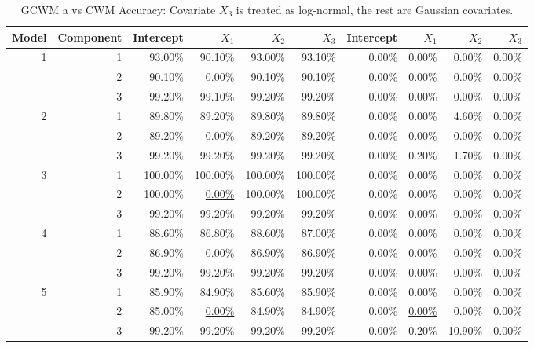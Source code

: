 \documentclass[11pt,letterpaper]{article}
\numberwithin{equation}{section}
\numberwithin{equation}{section}
\numberwithin{equation}{section}
\begin{document}
\begin{center}
\begin{table}[!htb]
\label{my-label}
\caption{GCWM a vs CWM Accuracy: Covariate $X_3$ is treated as log-normal, the rest are Gaussian covariates.}
\begin{adjustwidth}{-1cm}{}
\begin{tabular}{|rrrrrr|rrrr|}
\hline\hline
Model & Component & Intercept & $X_1$ &$X_2$ & $X_3$& Intercept & $X_1$ &$X_2$ & $X_3$  \\
\hline
1     & 1         & 93.00\%   & 90.10\%  & 93.00\%  & 93.10\% & 0.00\% & 0.00\% & 0.00\% & 0.00\%   \\
      & 2         & 90.10\%   & \underline{0.00\%}   & 90.10\%  & 90.10\% & 0.00\% & 0.00\% & 0.00\% & 0.00\%  \\
      & 3         & 99.20\%   & 99.10\%  & 99.20\%  & 99.20\% & 0.00\% & 0.00\% & 0.00\% & 0.00\%  \\
2     & 1         & 89.80\%   & 89.20\%  & 89.80\%  & 89.80\% & 0.00\% & 0.00\% & 4.60\% & 0.00\%  \\
      & 2         & 89.20\%   &\underline{0.00\%}   & 89.20\%  & 89.20\% & 0.00\% & \underline{0.00\%} & 0.00\% & 0.00\%   \\
      & 3         & 99.20\%   & 99.20\%  & 99.20\%  & 99.20\% & 0.00\% & 0.20\% & 1.70\% & 0.00\%  \\
3     & 1         & 100.00\%  & 100.00\% & 100.00\% & 100.00\%  & 0.00\% & 0.00\% & 0.00\% & 0.00\% \\
      & 2         & 100.00\%  & \underline{0.00\%}   & 100.00\% & 100.00\% & 0.00\% & 0.00\% & 0.00\% & 0.00\% \\
      & 3         & 99.20\%   & 99.20\%  & 99.20\%  & 99.20\%  & 0.00\% & 0.00\% & 0.00\% & 0.00\%\\
      4 & 1 & 88.60\% & 86.80\% & 88.60\% & 87.00\%  & 0.00\% & 0.00\% & 0.00\%  & 0.00\%  \\
  & 2 & 86.90\% &\underline{ 0.00\%}  & 86.90\% & 86.90\% & 0.00\% & \underline{0.00\%} & 0.00\%  & 0.00\%  \\
  & 3 & 99.20\% & 99.20\% & 99.20\% & 99.20\% & 0.00\% & 0.00\% & 0.00\%  & 0.00\% \\
5 & 1 & 85.90\% & 84.90\% & 85.60\% & 85.90\% & 0.00\% & 0.00\% & 0.00\%  & 0.00\% \\
  & 2 & 85.00\% &\underline{ 0.00\%}  & 84.90\% & 84.90\% & 0.00\% & \underline{0.00\%} & 0.00\%  & 0.00\%  \\
  & 3 & 99.20\% & 99.20\% & 99.20\% & 99.20\% & 0.00\% & 0.20\% & 10.90\% & 0.00\% \\
      \hline\hline
\end{tabular}
\end{adjustwidth}
\end{table}
\end{center}
\end{document}
